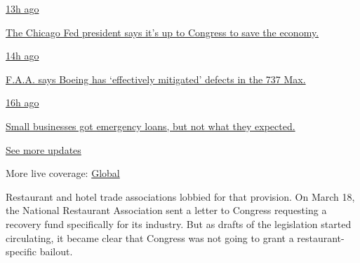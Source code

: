 \href{https://www.nytimes3xbfgragh.onion/live/2020/08/03/business/stock-market-today-coronavirus?action=click\&pgtype=Article\&state=default\&region=MAIN_CONTENT_1\&context=storylines_live_updates\#the-chicago-fed-president-says-its-up-to-congress-to-save-the-economy}{13h
ago}

\href{https://www.nytimes3xbfgragh.onion/live/2020/08/03/business/stock-market-today-coronavirus?action=click\&pgtype=Article\&state=default\&region=MAIN_CONTENT_1\&context=storylines_live_updates\#the-chicago-fed-president-says-its-up-to-congress-to-save-the-economy}{The
Chicago Fed president says it's up to Congress to save the economy.}

\href{https://www.nytimes3xbfgragh.onion/live/2020/08/03/business/stock-market-today-coronavirus?action=click\&pgtype=Article\&state=default\&region=MAIN_CONTENT_1\&context=storylines_live_updates\#faa-says-boeing-has-effectively-mitigated-defects-in-the-737-max}{14h
ago}

\href{https://www.nytimes3xbfgragh.onion/live/2020/08/03/business/stock-market-today-coronavirus?action=click\&pgtype=Article\&state=default\&region=MAIN_CONTENT_1\&context=storylines_live_updates\#faa-says-boeing-has-effectively-mitigated-defects-in-the-737-max}{F.A.A.
says Boeing has `effectively mitigated' defects in the 737 Max.}

\href{https://www.nytimes3xbfgragh.onion/live/2020/08/03/business/stock-market-today-coronavirus?action=click\&pgtype=Article\&state=default\&region=MAIN_CONTENT_1\&context=storylines_live_updates\#small-businesses-got-emergency-loans-but-not-what-they-expected}{16h
ago}

\href{https://www.nytimes3xbfgragh.onion/live/2020/08/03/business/stock-market-today-coronavirus?action=click\&pgtype=Article\&state=default\&region=MAIN_CONTENT_1\&context=storylines_live_updates\#small-businesses-got-emergency-loans-but-not-what-they-expected}{Small
businesses got emergency loans, but not what they expected.}

\href{https://www.nytimes3xbfgragh.onion/live/2020/08/03/business/stock-market-today-coronavirus?action=click\&pgtype=Article\&state=default\&region=MAIN_CONTENT_1\&context=storylines_live_updates}{See
more updates}

More live coverage:
\href{https://www.nytimes3xbfgragh.onion/2020/08/04/world/coronavirus-covid-19.html?action=click\&pgtype=Article\&state=default\&region=MAIN_CONTENT_1\&context=storylines_live_updates}{Global}

Restaurant and hotel trade associations lobbied for that provision. On
March 18, the National Restaurant Association sent a letter to Congress
requesting a recovery fund specifically for its industry. But as drafts
of the legislation started circulating, it became clear that Congress
was not going to grant a restaurant-specific bailout.

